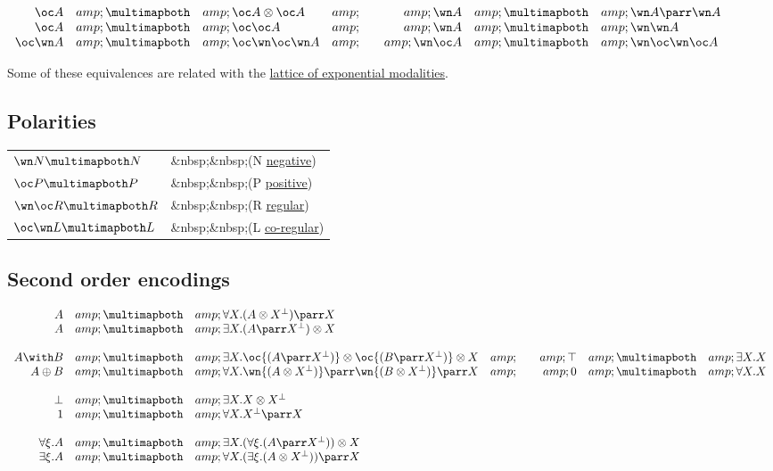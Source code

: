 \(\begin{array}{rclcrcl}
  \oc A &amp;\linequiv&amp; \oc A\tens\oc A &amp;\quad&amp; 
  \wn A &amp;\linequiv&amp; \wn A\parr\wn A\\
  \oc A &amp;\linequiv&amp; \oc\oc A &amp;\quad&amp; \wn A &amp;\linequiv&amp; \wn\wn A\\
  \oc\wn A &amp;\linequiv&amp; \oc\wn\oc\wn A &amp;\quad&amp; \wn\oc A &amp;\linequiv&amp; \wn\oc\wn\oc A\\
\end{array}\)

Some of these equivalences are related with the
\href{lattice_of_exponential_modalities}{lattice of exponential
modalities}.

\subsection{Polarities}\label{polarities}

\begin{longtable}[]{@{}ll@{}}
\toprule
\(\wn N \linequiv N\) & \&nbsp;\&nbsp;(N
\href{Negative_formula}{negative})\tabularnewline
\(\oc P \linequiv P\) & \&nbsp;\&nbsp;(P
\href{Positive_formula}{positive})\tabularnewline
\(\wn\oc R \linequiv R\) & \&nbsp;\&nbsp;(R
\href{Regular_formula}{regular})\tabularnewline
\(\oc\wn L \linequiv L\) & \&nbsp;\&nbsp;(L
\href{Co-regular_formula}{co-regular})\tabularnewline
\bottomrule
\end{longtable}

\subsection{Second order encodings}\label{second-order-encodings}

\(\begin{array}{rclcrcl}
  A &amp;\linequiv &amp;\forall X . (A \tens X\orth) \parr X \\
  A &amp;\linequiv &amp;\exists X . (A \parr X\orth) \tens X \\
\\
  A \with B &amp;\linequiv&amp; \exists X . \oc{(A \parr X\orth)} \tens \oc{(B \parr X\orth)} \tens X &amp;\quad&amp; \top &amp;\linequiv&amp; \exists X . X \\
  A \plus B &amp;\linequiv&amp; \forall X . \wn{(A \tens X\orth)} \parr \wn{(B \tens X\orth)} \parr X &amp;\quad&amp; \zero &amp;\linequiv&amp; \forall X . X \\
\\
 \bot &amp;\linequiv&amp; \exists X . X\tens X\orth \\
 \one &amp;\linequiv&amp; \forall X . X\orth\parr X \\
\\
  \forall \xi . A &amp;\linequiv&amp; \exists X . (\forall \xi . (A \parr X\orth)) \tens X \\
  \exists \xi . A &amp;\linequiv&amp; \forall X . (\exists \xi . (A \tens X\orth)) \parr X
\end{array}\)

